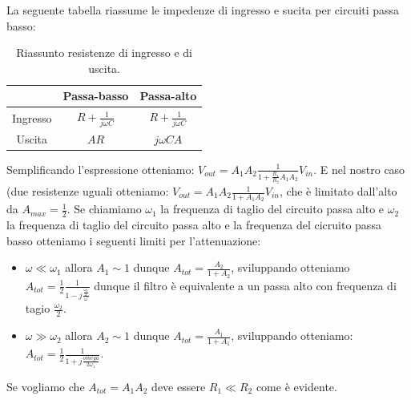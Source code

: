 \documentclass[10pt,a4paper]{article}
\begin{document}
La seguente tabella riassume le impedenze di ingresso e sucita per circuiti passa basso:

\begin{table}[h]
\centering
\begin{tabular}{|c|c|c|}
\hline
 & Passa-basso  & Passa-alto \\
\hline
Ingresso & $R+\frac{1}{j \omega C}$ & $R+\frac{1}{j \omega C}$\\
Uscita & $AR$ & $j \omega C A$\\
\hline
\end{tabular}
\caption{Riassunto resistenze di ingresso e di uscita.}
\end{table}

Semplificando l'espressione otteniamo: $V_{out} = A_{1} A_{2} \frac{1}{1+\frac{R_1}{R_2} A_1 A_2} V_{in}$.
E nel nostro caso (due resistenze uguali otteniamo:
$V_{out} = A_{1} A_{2} \frac{1}{1+A_1 A_2} V_{in}$, che è limitato dall'alto da $A_{max} = \frac{1}{2}$.
Se chiamiamo $\omega_1$ la frequenza di taglio del circuito passa alto e $\omega_2$ la frequenza di taglio del circuito passa alto e la frequenza del cicruito passa basso otteniamo i seguenti limiti per l'attenuazione:
\begin{itemize}
\item $\omega \ll \omega_1$ allora $A_1 \sim 1$ dunque
$A_{tot} = \frac{A_2}{1+A_2}$, sviluppando otteniamo
$A_{tot} = \frac{1}{2} \frac{1}{1-j \frac{\frac{\omega_2}{2}}{\omega}}$ dunque il filtro è equivalente a un passa alto con frequenza di tagio $\frac{\omega_2}{2}$.
\item $\omega \gg \omega_2$ allora $A_2 \sim 1$ dunque
$A_{tot} = \frac{A_1}{1+A_1}$, sviluppando otteniamo:
$A_{tot} = \frac{1}{2} \frac{1}{1+j \frac{omega}{2 \omega_1}}$.
\end{itemize}

Se vogliamo che $A_{tot} = A_1 A_2$ deve essere $R_1 \ll R_2$ come è evidente.
\end{document}
